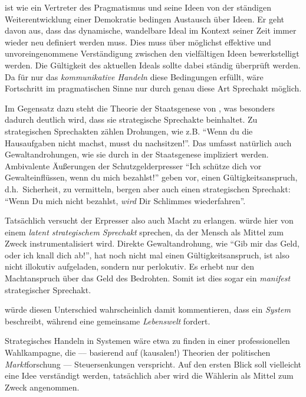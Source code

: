 \citeauthor{Dewey2010} ist wie \citeauthor{Habermas-1998-aa} ein Vertreter des Pragmatismus und seine Ideen von der ständigen Weiterentwicklung einer Demokratie bedingen Austausch über Ideen.
Er geht davon aus, dass das dynamische, wandelbare Ideal im Kontext seiner Zeit immer wieder neu definiert werden muss.
Dies muss über möglichst effektive und unvoreingenommene Verständigung zwischen den vielfältigen Ideen bewerkstelligt werden.
Die Gültigkeit des aktuellen Ideals sollte dabei ständig überprüft werden.
Da für \citeauthor{Habermas-1998-aa} nur das \emph{kommunikative Handeln} diese Bedingungen erfüllt, wäre Fortschritt im pragmatischen Sinne nur durch genau diese Art Sprechakt möglich.

Im Gegensatz dazu steht die Theorie der Staatsgenese von \citeauthor{Tilly-1985-aa}, was besonders dadurch deutlich wird, dass sie strategische Sprechakte beinhaltet.
Zu strategischen Sprechakten zählen Drohungen, wie z.B. ``Wenn du die Hausaufgaben nicht machst, musst du nachsitzen!''.
Das umfasst natürlich auch Gewaltandrohungen, wie sie durch \citeauthor{Tilly-1985-aa} in der Staatsgenese impliziert werden.
Ambivalente Äußerungen der Schutzgelderpresser ``Ich schütze dich vor Gewalteinflüssen, wenn du mich bezahlst!'' geben vor, einen Gültigkeitsanspruch, d.h.\ Sicherheit, zu vermitteln, bergen aber auch einen strategischen Sprechakt: ``Wenn Du mich nicht bezahlst, \emph{wird} Dir Schlimmes wiederfahren''.

Tatsächlich versucht der Erpresser also auch Macht zu erlangen.
\citeauthor{Habermas-1998-aa} würde hier von einem \emph{latent strategischem Sprechakt} sprechen, da der Mensch als Mittel zum Zweck instrumentalisiert wird.
Direkte Gewaltandrohung, wie ``Gib mir das Geld, oder ich knall dich ab!'', hat noch nicht mal einen Gültigkeitsanspruch, ist also nicht illokutiv aufgeladen, sondern nur perlokutiv.
Es erhebt nur den Machtanspruch über das Geld des Bedrohten.
Somit ist dies sogar ein \emph{manifest} strategischer Sprechakt.

\citeauthor{Habermas-1998-aa} würde diesen Unterschied wahrscheinlich damit kommentieren, dass \citeauthor{Tilly-1985-aa} ein \emph{System} beschreibt, während \citeauthor{Dewey2010} eine gemeinsame \emph{Lebenswelt} fordert.

Strategisches Handeln in Systemen wäre etwa zu finden in einer professionellen Wahlkampagne, die –-- basierend auf (kausalen!) Theorien der politischen \emph{Markt}forschung --- Steuersenkungen verspricht.
Auf den ersten Blick soll vielleicht eine Idee verständigt werden, tatsächlich aber wird die Wählerin als Mittel zum Zweck angenommen.

